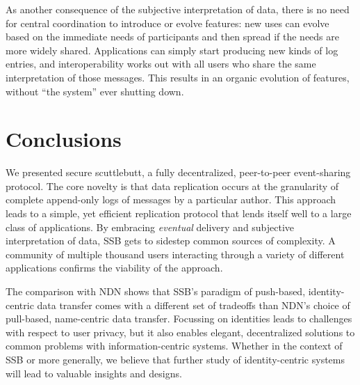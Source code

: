 \documentclass[10pt,sigconf,rewiew]{acmart}
\begin{document}
As another consequence of the subjective interpretation of data, there is no need for central coordination to introduce or evolve features: new uses can evolve based on the immediate needs of participants and then spread if the needs are more widely shared. Applications can simply start producing new kinds of log entries, and interoperability works out with all users who share the same interpretation of those messages.  This results in an organic evolution of features, without ``the system'' ever shutting down.



\section{Conclusions}

We presented secure scuttlebutt, a fully decentralized, peer-to-peer event-sharing protocol. The core novelty is that data replication occurs at the granularity of complete append-only logs of messages by a particular author. This approach leads to a simple, yet efficient replication protocol that lends itself well to a large class of applications. By embracing \textit{eventual} delivery and subjective interpretation of data, SSB gets to sidestep common sources of complexity. A community of multiple thousand users interacting through a variety of different applications confirms the viability of the approach.

The comparison with NDN shows that SSB's paradigm of push-based, identity-centric data transfer comes with a different set of tradeoffs than NDN's choice of pull-based, name-centric data transfer. Focussing on identities leads to challenges with respect to user privacy, but it also enables elegant, decentralized solutions to common problems with information-centric systems. Whether in the context of SSB or more generally, we believe that further study of identity-centric systems will lead to valuable insights and designs.

\newpage
\clearpage
\newpage


\end{document}
